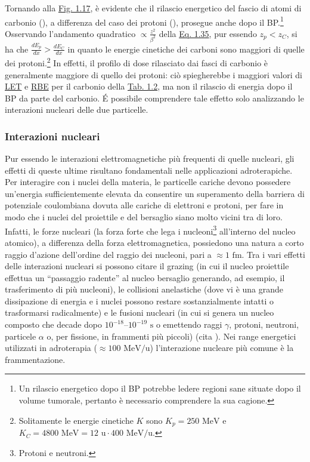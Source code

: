 \documentclass[12pt,a4paper,twoside]{report}
\begin{document}
	Tornando alla \hyperref[fig:photon]{Fig. 1.17}, è evidente che il rilascio energetico del fascio di atomi di carbonio (), a differenza del caso dei protoni (), prosegue anche dopo il BP.\footnote{Un rilascio energetico dopo il BP potrebbe ledere regioni sane situate dopo il volume tumorale, pertanto è necessario comprendere la sua cagione.} Osservando l'andamento quadratico $\propto\frac{z^2}{\beta^2}$ della \hyperref[eq:bethe_bloch]{Eq. 1.35}, pur essendo $z_p<z_C$, si ha che $\frac{dE_p}{dx}>\frac{dE_C}{dx}$ in quanto le energie cinetiche dei carboni sono maggiori di quelle dei protoni.\footnote{Solitamente le energie cinetiche $K$ sono $K_p=250 \mbox{ MeV}$ e $K_C=4800\mbox{ MeV}=12\mbox{ u}\cdot400\mbox{ MeV/u}$.} In effetti, il profilo di dose rilasciato dai fasci di carbonio è generalmente maggiore di quello dei protoni: ciò spiegherebbe i maggiori valori di \hyperref[par:let]{LET} e \hyperref[par:rbe]{RBE} per il carbonio della \hyperref[tab:let_rbe]{Tab. 1.2}, ma non il rilascio di energia dopo il BP da parte del carbonio. \'E possibile comprendere tale effetto solo analizzando le interazioni nucleari delle due particelle.
	
	\subsubsection{Interazioni nucleari}\label{par:interazioni_nucleari}
	Pur essendo le interazioni elettromagnetiche più frequenti di quelle nucleari, gli effetti di queste ultime risultano fondamentali nelle applicazioni adroterapiche. Per interagire con i nuclei della materia, le particelle cariche devono possedere un'energia sufficientemente elevata da consentire un superamento della barriera di potenziale coulombiana dovuta alle cariche di elettroni e protoni, per fare in modo che i nuclei del proiettile e del bersaglio siano molto vicini tra di loro. Infatti, le forze nucleari (la forza forte che lega i nucleoni\footnote{Protoni e neutroni.} all'interno del nucleo atomico), a differenza della forza elettromagnetica, possiedono una natura a corto raggio d'azione dell'ordine del raggio dei nucleoni, pari a $\approx1\mbox{ fm}$. Tra i vari effetti delle interazioni nucleari si possono citare il grazing (in cui il nucleo proiettile effettua un ``passaggio radente'' al nucleo bersaglio generando, ad esempio, il trasferimento di più nucleoni), le collisioni anelastiche (dove vi è una grande dissipazione di energia e i nuclei possono restare sostanzialmente intatti o trasformarsi radicalmente) e le fusioni nucleari (in cui si genera un nucleo composto che decade dopo $10^{-18}$--$10^{-19}\mbox{ s}$ o emettendo raggi $\gamma$, protoni, neutroni, particele $\alpha$ o, per fissione, in frammenti più piccoli) (cita
	). Nei range energetici utilizzati in adroterapia ($\approx100\mbox{ MeV/u}$) l'interazione nucleare più comune è la frammentazione.
	
\end{document}
